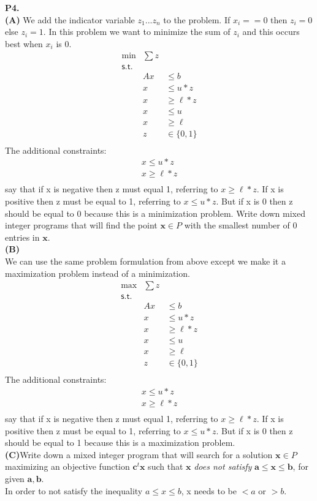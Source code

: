 \documentclass[11pt]{article}
\begin{document}
\medskip
\newpage
\noindent\textbf{P4.}
\\
\noindent\textbf{(A)}
We add the indicator variable $z_1...z_n$ to the problem.  If $x_i == 0$ then $z_i = 0$ else $z_i = 1$.  In this problem we want to minimize the sum of $z_i$ and this occurs best when $x_i$ is 0.
\[\begin{array}{rlllllllll}
\min & \sum z \\
\mathsf{s.t. } \\
& Ax & \leq b \\
& x & \leq u*z \\
& x & \geq \ell*z \\
& x & \leq u \\
& x & \geq \ell \\
& z & \in \{0,1\} \\
\end{array}\]
The additional constraints:
\begin{align*}
x \leq u*z \\
x \geq \ell*z \\
\end{align*}
say that if x is negative then z must equal 1, referring to $x \geq \ell*z$.  If x is positive then z must be equal to 1, referring to $x\leq u*z$.  But if x is 0 then z should be equal to 0 because this is a minimization problem.
Write down mixed integer programs that will find the
point $\mathbf{x} \in P$ with the smallest number of $0$ entries in $\mathbf{x}$.
\\
\noindent\textbf{(B)}\\
We can use the same problem formulation from above except we make it a maximization problem instead of a minimization.
\[\begin{array}{rlllllllll}
\max & \sum z \\
\mathsf{s.t. } \\
& Ax & \leq b \\
& x & \leq u*z \\
& x & \geq \ell*z \\
& x & \leq u \\
& x & \geq \ell \\
& z & \in \{0,1\} \\
\end{array}\]
The additional constraints:
\begin{align*}
x \leq u*z \\
x \geq \ell*z \\
\end{align*}
say that if x is negative then z must equal 1, referring to $x \geq \ell*z$.  If x is positive then z must be equal to 1, referring to $x\leq u*z$.  But if x is 0 then z should be equal to 1 because this is a maximization problem.
\\
\noindent\textbf{(C)}Write down a mixed integer program that will search for a solution
$\mathbf{x} \in P$ maximizing an objective function $\mathbf{c}^t \mathbf{x}$ 
such that $\mathbf{x}$ \emph{does not satisfy}
$\mathbf{a} \leq \mathbf{x} \leq \mathbf{b}$, for given $\mathbf{a}, \mathbf{b}$.
\\
In order to not satisfy the inequality $a \leq x \leq b$, x needs to be $< a$ or $> b$.
\medskip
\end{document}
